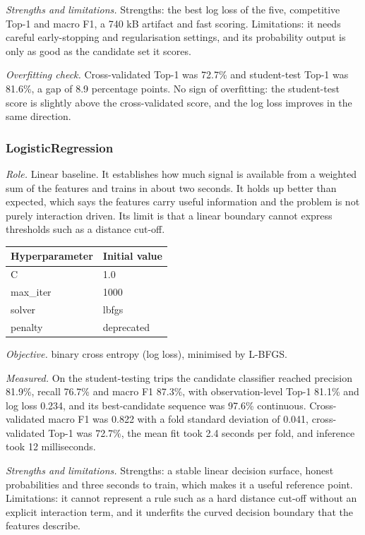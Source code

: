 \documentclass[11pt,a4paper]{article}
\begin{document}
\noindent\textit{Strengths and limitations.} Strengths: the best log loss of the five, competitive Top-1 and macro F1, a 740 kB artifact and fast scoring. Limitations: it needs careful early-stopping and regularisation settings, and its probability output is only as good as the candidate set it scores.

\noindent\textit{Overfitting check.} Cross-validated Top-1 was 72.7\% and student-test Top-1 was 81.6\%, a gap of 8.9 percentage points. No sign of overfitting: the student-test score is slightly above the cross-validated score, and the log loss improves in the same direction.

\subsubsection*{LogisticRegression}
\noindent\textit{Role.} Linear baseline. It establishes how much signal is available from a weighted sum of the features and trains in about two seconds. It holds up better than expected, which says the features carry useful information and the problem is not purely interaction driven. Its limit is that a linear boundary cannot express thresholds such as a distance cut-off.

\begin{center}\small\begin{tabular}{@{}ll@{}}\toprule\textbf{Hyperparameter} & \textbf{Initial value} \\ \midrule
C & 1.0 \\
max\_iter & 1000 \\
solver & lbfgs \\
penalty & deprecated \\
\bottomrule\end{tabular}\end{center}

\noindent\textit{Objective.} binary cross entropy (log loss), minimised by L-BFGS.

\noindent\textit{Measured.} On the student-testing trips the candidate classifier reached precision 81.9\%, recall 76.7\% and macro F1 87.3\%, with observation-level Top-1 81.1\% and log loss 0.234, and its best-candidate sequence was 97.6\% continuous. Cross-validated macro F1 was 0.822 with a fold standard deviation of 0.041, cross-validated Top-1 was 72.7\%, the mean fit took 2.4 seconds per fold, and inference took 12 milliseconds.

\noindent\textit{Strengths and limitations.} Strengths: a stable linear decision surface, honest probabilities and three seconds to train, which makes it a useful reference point. Limitations: it cannot represent a rule such as a hard distance cut-off without an explicit interaction term, and it underfits the curved decision boundary that the features describe.
\end{document}
